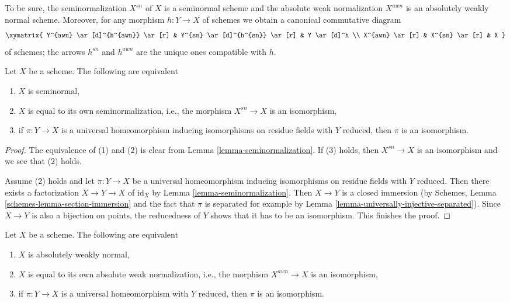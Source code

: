 \noindent
To be sure, the seminormalization $X^{sn}$ of $X$ is a seminormal
scheme and the absolute weak normalization $X^{awn}$ is an
absolutely weakly normal scheme.
Moreover, for any morphism $h : Y \to X$ of schemes we obtain a
canonical commutative diagram
$$
\xymatrix{
Y^{awn} \ar[d]^{h^{awn}} \ar[r] &
Y^{sn} \ar[d]^{h^{sn}} \ar[r] &
Y \ar[d]^h \\
X^{awn} \ar[r] &
X^{sn} \ar[r] &
X
}
$$
of schemes; the arrows $h^{sn}$ and $h^{awn}$ are the unique
ones compatible with $h$.

\begin{lemma}
\label{lemma-characterize-seminormal}
Let $X$ be a scheme. The following are equivalent
\begin{enumerate}
\item $X$ is seminormal,
\item $X$ is equal to its own seminormalization, i.e., the morphism
$X^{sn} \to X$ is an isomorphism,
\item if $\pi : Y \to X$ is a universal homeomorphism inducing isomorphisms
on residue fields with $Y$ reduced, then $\pi$ is an isomorphism.
\end{enumerate}
\end{lemma}

\begin{proof}
The equivalence of (1) and (2) is clear from
Lemma \ref{lemma-seminormalization}. If (3) holds, then $X^{sn} \to X$
is an isomorphism and we see that (2) holds.

\medskip\noindent
Assume (2) holds and let $\pi : Y \to X$ be a universal homeomorphism
inducing isomorphisms on residue fields with $Y$ reduced. Then there exists
a factorization $X \to Y \to X$ of $\text{id}_X$ by
Lemma \ref{lemma-seminormalization}. Then $X \to Y$ is a closed immersion
(by Schemes, Lemma \ref{schemes-lemma-section-immersion}
and the fact that $\pi$ is separated for example by
Lemma \ref{lemma-universally-injective-separated}). Since $X \to Y$
is also a bijection on points, the reducedness of $Y$ shows that it
has to be an isomorphism. This finishes the proof.
\end{proof}

\begin{lemma}
\label{lemma-characterize-absolutely-weakly-normal}
Let $X$ be a scheme. The following are equivalent
\begin{enumerate}
\item $X$ is absolutely weakly normal,
\item $X$ is equal to its own absolute weak normalization, i.e., the morphism
$X^{awn} \to X$ is an isomorphism,
\item if $\pi : Y \to X$ is a universal homeomorphism with $Y$ reduced, then
$\pi$ is an isomorphism.
\end{enumerate}
\end{lemma}

